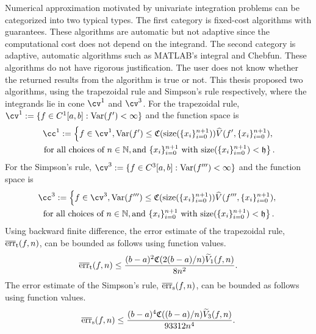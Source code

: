 \documentclass{iitthesis}
\DeclareMathOperator{\Var}{Var}
\theoremstyle{definition}
\theoremstyle{remark}
\begin{document}

Numerical approximation motivated by univariate integration problems can be categorized into two typical types. The first category is fixed-cost algorithms with guarantees. These algorithms are automatic but not adaptive since the computational cost does not depend on the integrand. The second category is adaptive, automatic algorithms such as MATLAB's integral and Chebfun. These algorithms do not have rigorous justification. The user does not know whether the returned results from the algorithm is true or not. This thesis proposed two algorithms, using the trapezoidal rule and Simpson's rule respectively, where the integrands lie in cone $\cv^1$ and $\cv^3$. For the trapezoidal rule, $\cv^{1}:=\{f\in C^{1}[a,b]: \Var(f') < \infty \}$ and the function space is
\begin{multline*}
\cc^{1}:=\left\{f\in \cv^{1}, \Var(f')\leq \mathfrak{C}(\text{size}(\{x_i\}_{i=0}^{n+1}))\widehat{V}(f',\{x_i\}_{i=0}^{n+1}),\right.\\ \left.\text{for all choices of } n\in \mathbb{N}, \text{and }\{x_i\}_{i=0}^{n+1} \text{ with }\text{size}(\{x_i\}_{i=0}^{n+1})<\mathfrak{h}\right\}.
\end{multline*}
 For the Simpson's rule, $\cv^{3}:=\{f\in C^{3}[a,b]: \Var(f''') < \infty \}$ and the function space is
 \begin{multline*}
\cc^{3}:=\left\{f\in \cv^{3}, \Var(f''')\leq \mathfrak{C}(\text{size}(\{x_i\}_{i=0}^{n+1}))\widehat{V}(f''',\{x_i\}_{i=0}^{n+1}),\right.\\ \left.\text{for all choices of } n\in \mathbb{N}, \text{and }\{x_i\}_{i=0}^{n+1} \text{ with }\text{size}(\{x_i\}_{i=0}^{n+1})<\mathfrak{h}\right\}.
\end{multline*}
  Using backward finite difference, the error estimate of the trapezoidal rule, $\overline{\textup{err}}_{\textup{t}}(f,n)$, can be bounded as follows using function values.
 \begin{equation*}
   \overline{\textup{err}}_{\textup{t}}(f,n)\leq \frac{(b-a)^2\mathfrak{C}(2(b-a)/n)\widetilde{V}_1(f,n)}{8n^2}.
 \end{equation*}
The error estimate of the Simpson's rule, $\overline{\textup{err}}_{\textup{s}}(f,n)$, can be bounded as follows using function values.
\begin{equation*}
  \overline{\textup{err}}_{\text{s}}(f,n)\leq \frac{(b-a)^4\mathfrak{C}((b-a)/n)\widetilde{V}_3(f,n)}{93312n^4}.
\end{equation*}
\end{document}
